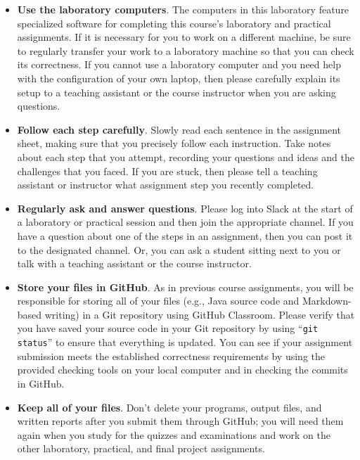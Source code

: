 \documentclass[11pt]{article}
\newcommand{\command}[1]{``\lstinline{#1}''}
\begin{document}
\begin{itemize}
  \setlength{\itemsep}{0pt}

\item {\bf Use the laboratory computers}. The computers in this laboratory feature specialized software for completing
  this course's laboratory and practical assignments. If it is necessary for you to work on a different machine, be sure
  to regularly transfer your work to a laboratory machine so that you can check its correctness. If you cannot use a
  laboratory computer and you need help with the configuration of your own laptop, then please carefully explain its
  setup to a teaching assistant or the course instructor when you are asking questions.

\item {\bf Follow each step carefully}. Slowly read each sentence in the assignment sheet, making sure that you
  precisely follow each instruction. Take notes about each step that you attempt, recording your questions and ideas and
  the challenges that you faced. If you are stuck, then please tell a teaching assistant or instructor what assignment
  step you recently completed.

\item {\bf Regularly ask and answer questions}. Please log into Slack at the start of a laboratory or practical session
  and then join the appropriate channel. If you have a question about one of the steps in an assignment, then you can
  post it to the designated channel. Or, you can ask a student sitting next to you or talk with a teaching assistant or
  the course instructor.

\item {\bf Store your files in GitHub}. As in previous course assignments, you will be responsible for storing
  all of your files (e.g., Java source code and Markdown-based writing) in a Git repository using GitHub Classroom.
  Please verify that you have saved your source code in your Git repository by using \command{git status} to ensure that
  everything is updated. You can see if your assignment submission meets the established correctness requirements by
  using the provided checking tools on your local computer and in checking the commits in GitHub.

\item {\bf Keep all of your files}. Don't delete your programs, output files, and written reports after you submit them
  through GitHub; you will need them again when you study for the quizzes and examinations and work on the other
  laboratory, practical, and final project assignments.


\end{itemize}
\end{document}
